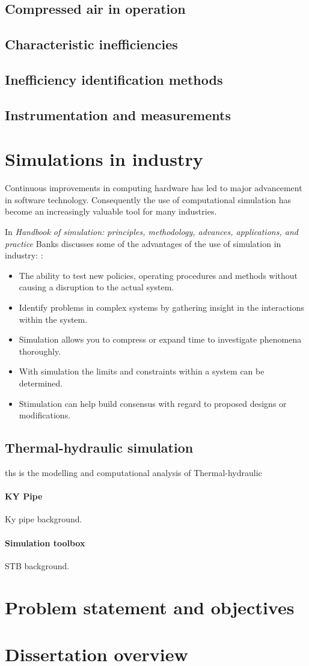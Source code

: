 	\subsection{Compressed air in operation}
	\subsection{Characteristic inefficiencies}
	\subsection{Inefficiency identification methods}
	\subsection{Instrumentation and measurements}
\section{Simulations in industry}

Continuous improvements in computing hardware has led to major advancement in software technology. Consequently the use of computational simulation has become an increasingly valuable tool for many industries.\cite{kocsis2003integration} \par 

 In \textit{ Handbook of simulation: principles, methodology, advances, applications, and practice} Banks discusses some of the advantages of the use of simulation in industry: \cite{banks1998handbook}:
\begin{itemize}
	\item The ability to test new policies, operating procedures and methods without causing a disruption to the actual system.
	\item Identify problems in complex systems by gathering insight in the interactions within the system.
	\item Simulation allows you to compress or expand time to investigate phenomena thoroughly.
	\item With simulation the limits and constraints within a system can be determined.
	\item Stimulation can help build consensus with regard to proposed designs or modifications.
\end{itemize}

\subsection{Thermal-hydraulic simulation}
\gls{ths} is the modelling and  computational analysis of Thermal-hydraulic
\paragraph{KY Pipe}
Ky pipe background. \cite{Wood1993KYPipe}
\paragraph{Simulation toolbox}
STB background.
\section{Problem statement and objectives}
\section{Dissertation overview}